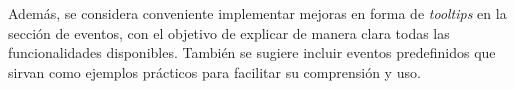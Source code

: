Además, se considera conveniente implementar mejoras en forma de \textit{tooltips} en la sección de eventos, con el objetivo de explicar de manera clara todas las funcionalidades disponibles. También se sugiere incluir eventos predefinidos que sirvan como ejemplos prácticos para facilitar su comprensión y uso.


